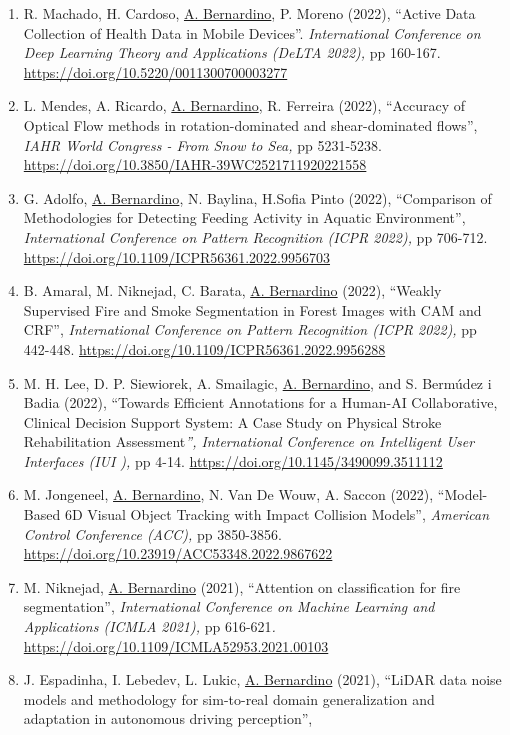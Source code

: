 \documentclass[
]{article}
\begin{document}
\begin{enumerate}
\item
  R. Machado, H. Cardoso, \ul{A. Bernardino}, P. Moreno (2022), ``Active
  Data Collection of Health Data in Mobile Devices''.
  \emph{International Conference on Deep Learning Theory and
  Applications (DeLTA 2022),} pp 160-167.
  \url{https://doi.org/10.5220/0011300700003277}~~
\item
  L. Mendes, A. Ricardo, \ul{A. Bernardino}, R. Ferreira (2022),
  ``Accuracy of Optical Flow methods in rotation-dominated and
  shear-dominated flows'', \emph{IAHR World Congress - From Snow to
  Sea,} pp 5231-5238.
  \url{https://doi.org/10.3850/IAHR-39WC2521711920221558}~
\item
  G. Adolfo, \ul{A. Bernardino}, N. Baylina, H.Sofia Pinto (2022),
  ``Comparison of Methodologies for Detecting Feeding Activity in
  Aquatic Environment'', \emph{International Conference on Pattern
  Recognition (ICPR 2022),} pp 706-712.
  \url{https://doi.org/10.1109/ICPR56361.2022.9956703}~
\item
  B. Amaral, M. Niknejad, C. Barata, \ul{A. Bernardino} (2022), ``Weakly
  Supervised Fire and Smoke Segmentation in Forest Images with CAM and
  CRF'', \emph{International Conference on Pattern Recognition (ICPR
  2022),} pp 442-448.
  \url{https://doi.org/10.1109/ICPR56361.2022.9956288}~
\item
  M. H. Lee, D. P. Siewiorek, A. Smailagic, \ul{A. Bernardino}, and S.
  Bermúdez i Badia (2022), ``Towards Efficient Annotations for a
  Human-AI Collaborative, Clinical Decision Support System: A Case Study
  on Physical Stroke Rehabilitation Assessment\emph{'', International
  Conference on Intelligent User Interfaces (IUI ),}
  pp 4-14. \url{https://doi.org/10.1145/3490099.3511112}~
\item
  M. Jongeneel, \ul{A. Bernardino}, N. Van De Wouw, A. Saccon (2022),
  ``Model-Based 6D Visual Object Tracking with Impact Collision
  Models'', \emph{American Control Conference (ACC),} pp 3850-3856.
  \url{https://doi.org/10.23919/ACC53348.2022.9867622}~
\item
  M. Niknejad, \ul{A. Bernardino} (2021), ``Attention on classification
  for fire segmentation'', \emph{International Conference on Machine
  Learning and Applications (ICMLA 2021),} pp 616-621\emph{.}
  \url{https://doi.org/10.1109/ICMLA52953.2021.00103}~
\item
  J. Espadinha, I. Lebedev, L. Lukic, \ul{A. Bernardino} (2021), ``LiDAR
  data noise models and methodology for sim-to-real domain
  generalization and adaptation in autonomous driving perception'',

\end{enumerate}
\end{document}
